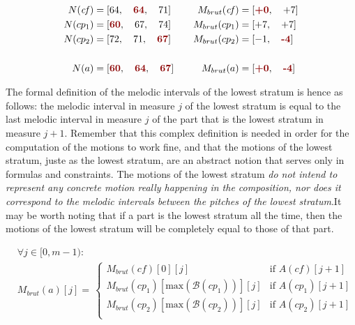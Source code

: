 \begin{equation}
    \begin{aligned}        
    N(\mathit{cf}) &= [64,\quad  \textcolor{darkred}{\textbf{64}},\quad  71] \quad 
    &M_{brut}(\mathit{cf}) &= [\textcolor{darkred}{\textbf{+0}}, \quad +7]\\
    N(cp_1) &= [\textcolor{darkred}{\textbf{60}},\quad  67,\quad  74] \quad 
    &M_{brut}(cp_1) &= [+7, \quad +7]\\
    N(cp_2) &= [72,\quad  71,\quad  \textcolor{darkred}{\textbf{67}}] \quad 
    &M_{brut}(cp_2) &= [-1, \quad \textcolor{darkred}{\textbf{-4}}]\\
    \\
    N(a) &= [\textcolor{darkred}{\textbf{60}},\quad  \textcolor{darkred}{\textbf{64}},\quad  \textcolor{darkred}{\textbf{67}}] \quad 
    &M_{brut}(a) &= [\textcolor{darkred}{\textbf{+0}}, \quad \textcolor{darkred}{\textbf{-4}}]\\
\end{aligned}
\label{eq:defining-m-intervals-bass}
\end{equation}


The formal definition of the melodic intervals of the lowest stratum is hence as follows: the melodic interval in measure $j$ of the lowest stratum is equal to the last melodic interval in measure $j$ of the part that is the lowest stratum in measure $j+1$. Remember that this complex definition is needed in order for the computation of the motions to work fine, and that the motions of the lowest stratum, juste as the lowest stratum, are an abstract notion that serves only in formulas and constraints. The motions of the lowest stratum \textit{do not intend to represent any concrete motion really happening in the composition, nor does it correspond to the melodic intervals between the pitches of the lowest stratum}.It may be worth noting that if a part is the lowest stratum all the time, then the motions of the lowest stratum will be completely equal to those of that part.

\begin{equation}
    \begin{aligned}
        &\forall j \in [0, m-1):\\
        &M_{brut}(a)[j] = \,  
        \begin{cases}
            M_{brut}(\mathit{cf})[0][j] & \text{if } A(\mathit{cf})[j+1]\\
            M_{brut}(cp_1)[\text{max}(\mathcal{B}(cp_1))][j] & \text{if } A(cp_1)[j+1]\\
            M_{brut}(cp_2)[\text{max}(\mathcal{B}(cp_2))][j] & \text{if } A(cp_2)[j+1]\\
        \end{cases}
    \end{aligned}
\end{equation}

